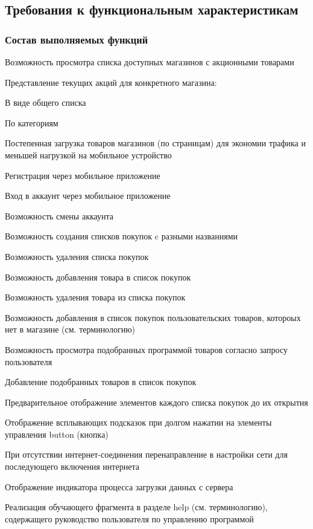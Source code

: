 \subsection{Требования к функциональным характеристикам}

\subsubsection{Состав выполняемых функций}
\begin{my_enumerate}
\item Возможность просмотра списка доступных магазинов с акционными товарами
\item Представление текущих акций для конкретного магазина:
    \begin{my_enumerate}
    \item В виде общего списка
    \item По категориям
    \end{my_enumerate}
\item Постепенная загрузка товаров магазинов (по страницам) для экономии трафика и меньшей нагрузкой на мобильное устройство
\item Регистрация через мобильное приложение
\item Вход в аккаунт через мобильное приложение
\item Возможность смены аккаунта
\item Возможность создания списков покупок c разными названиями
\item Возможность удаления списка покупок
\item Возможность добавления товара в список покупок
\item Возможность удаления товара из списка покупок
\item Возможность добавления в список покупок пользовательских товаров, котороых нет в магазине (см. терминологию)
\item Возможность просмотра подобранных программой товаров согласно запросу пользователя
\item Добавление подобранных товаров в список покупок
\item Предварительное отображение элементов каждого списка покупок до их открытия
\item Отображение всплывающих подсказок при долгом нажатии на элементы управления button (кнопка)
\item При отсутствии интернет-соединения перенаправление в настройки сети для последующего включения интернета
\item Отображение индикатора процесса загрузки данных с сервера
\item Реализация обучающего фрагмента в разделе help (см. терминологию), содержащего руководство пользователя по управлению программой
\end{my_enumerate}

